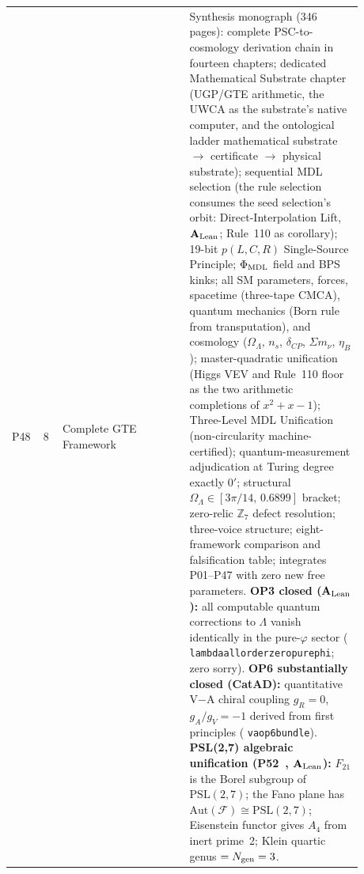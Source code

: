 \documentclass[11pt]{article}
\newcommand{\lean}[1]{%
  \penalty-100
  \begingroup\def\_{{\textunderscore\allowbreak}}\texttt{#1}\endgroup}
\newcommand{\CatAL}{\ensuremath{\textbf{A}_{\rm Lean}}}
\begin{document}
\begin{longtable}{@{}P{0.05\linewidth}P{0.05\linewidth}P{0.33\linewidth}P{0.45\linewidth}@{}}
P48 & 8 & Complete GTE Framework & Synthesis monograph (346 pages): complete PSC-to-cosmology derivation chain in fourteen chapters; dedicated Mathematical Substrate chapter (UGP/GTE arithmetic, the UWCA as the substrate's native computer, and the ontological ladder mathematical substrate $\to$ certificate $\to$ physical substrate); sequential MDL selection (the rule selection consumes the seed selection's orbit: Direct-Interpolation Lift, $\CatAL$; Rule~110 as corollary); 19-bit $p(L,C,R)$ Single-Source Principle; $\Phi_{\rm MDL}$ field and BPS kinks; all SM parameters, forces, spacetime (three-tape CMCA), quantum mechanics (Born rule from transputation), and cosmology ($\Omega_\Lambda$, $n_s$, $\delta_{CP}$, $\Sigma m_\nu$, $\eta_B$); master-quadratic unification (Higgs VEV and Rule~110 floor as the two arithmetic completions of $x^2+x-1$); Three-Level MDL Unification (non-circularity machine-certified); quantum-measurement adjudication at Turing degree exactly $0'$; structural $\Omega_\Lambda \in [3\pi/14,\,0.6899]$ bracket; zero-relic $\mathbb{Z}_7$ defect resolution; three-voice structure; eight-framework comparison and falsification table; integrates P01--P47 with zero new free parameters. \textbf{OP3 closed ($\CatAL$):} all computable quantum corrections to $\Lambda$ vanish identically in the pure-$\varphi$ sector (\lean{lambda\_all\_order\_zero\_pure\_phi}; zero sorry). \textbf{OP6 substantially closed (CatAD):} quantitative V$-$A chiral coupling $g_R=0$, $g_A/g_V=-1$ derived from first principles (\lean{va\_op6\_bundle}). \textbf{PSL(2,7) algebraic unification (P52~\cite{SpivackPSL27Unification}, $\CatAL$):} $F_{21}$ is the Borel subgroup of $\mathrm{PSL}(2,7)$; the Fano plane has $\mathrm{Aut}(\mathcal{F})\cong\mathrm{PSL}(2,7)$; Eisenstein functor gives $A_4$ from inert prime~2; Klein quartic genus $= N_{\rm gen} = 3$. \\

\end{longtable}
\end{document}
